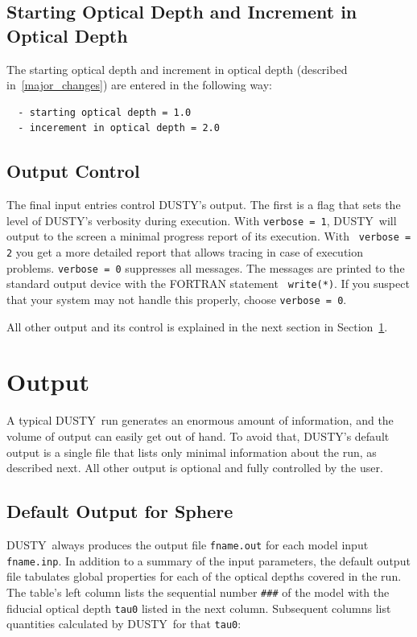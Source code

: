 \documentclass[11pt]{article}
\def\D  {{\sf DUSTY}}
\begin{document}
\subsection{Starting Optical Depth and Increment in Optical Depth}
\label{starting_opt_depth}

The starting optical depth and increment in optical depth (described 
in~\ref{major_changes}) are entered in the following way:
%
\begin{verbatim}
  - starting optical depth = 1.0
  - incerement in optical depth = 2.0
\end{verbatim}


\subsection{Output Control}

The final input entries control \D's output. The first is a flag that sets the
level of \D's verbosity during execution.  With {\tt verbose = 1}, \D\ will
output to the screen a minimal progress report of its execution. With {\tt
verbose = 2} you get a more detailed report that allows tracing in case of
execution problems. {\tt verbose = 0} suppresses all messages.  The messages
are printed to the standard output device with the FORTRAN statement {\tt
write(*)}.  If you suspect that your system may not handle this properly,
choose {\tt verbose = 0}.

All other output and its control is explained in the next section in 
Section~\ref{output}.


\section{Output}
\label{output}

A typical \D\ run generates an enormous amount of information, and the volume
of output can easily get out of hand. To avoid that, \D's default output is a
single file that lists only minimal information about the run, as described
next. All other output is optional and fully controlled by the user.


\subsection{Default Output for Sphere}
\label{default_sph}

\D\ always produces the output file {\tt fname.out} for each model input {\tt
fname.inp}. In addition to a summary of the input parameters, the default
output file tabulates global properties for each of the optical depths covered
in the run. The table's left column lists the sequential number {\tt \#\#\#} of
the model with the fiducial optical depth {\tt tau0} listed in the next column.
Subsequent columns list quantities calculated by \D\ for that {\tt tau0}:
\end{document}

